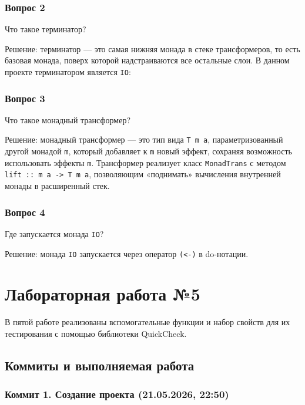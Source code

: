 \documentclass[a4paper, final]{article}
\begin{document}
\subsubsection{Вопрос 2}

Что такое терминатор?

Решение: терминатор — это самая нижняя монада в стеке трансформеров, то есть
базовая монада, поверх которой надстраиваются все остальные слои. В данном
проекте терминатором является \texttt{IO}:

\subsubsection{Вопрос 3}

Что такое монадный трансформер?

Решение: монадный трансформер — это тип вида \texttt{T m a}, параметризованный
другой монадой \texttt{m}, который добавляет к \texttt{m} новый эффект, сохраняя возможность
использовать эффекты \texttt{m}. Трансформер реализует класс
\texttt{MonadTrans} с методом \texttt{lift :: m a -> T m a}, позволяющим
«поднимать» вычисления внутренней монады в расширенный стек.

\subsubsection{Вопрос 4}

Где запускается монада \texttt{IO}?

Решение: монада \texttt{IO} запускается через оператор \texttt{(<-)} в
do-нотации.


\section{Лабораторная работа №5}

В пятой работе реализованы вспомогательные функции и набор свойств для их
тестирования с помощью библиотеки QuickCheck.

\subsection{Коммиты и выполняемая работа}

\subsubsection{Коммит 1. Создание проекта (21.05.2026, 22:50)}
\end{document}
